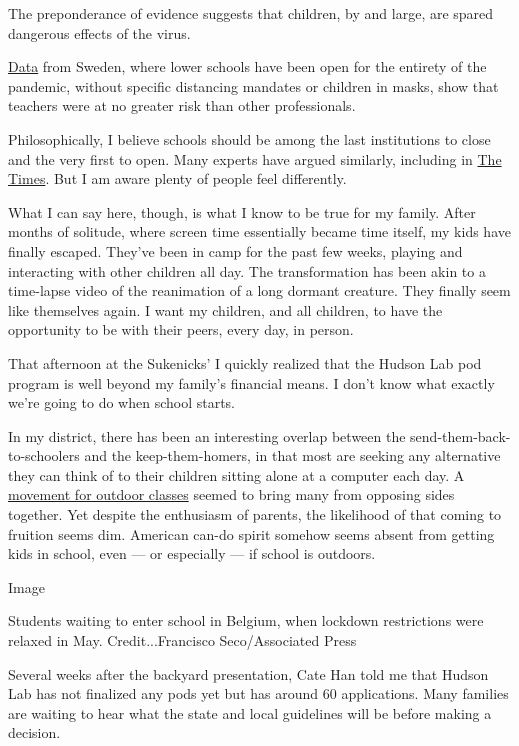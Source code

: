 The preponderance of evidence suggests that children, by and large, are
spared dangerous effects of the virus.

\href{https://www.folkhalsomyndigheten.se/contentassets/5e248b82cc284971a1c5fd922e7770f8/forekomst-covid-19-olika-yrkesgrupper.pdf}{Data}
from Sweden, where lower schools have been open for the entirety of the
pandemic, without specific distancing mandates or children in masks,
show that teachers were at no greater risk than other professionals.

Philosophically, I believe schools should be among the last institutions
to close and the very first to open. Many experts have argued similarly,
including in
\href{https://www.nytimes.com/2020/07/01/opinion/coronavirus-schools.html}{The
Times}. But I am aware plenty of people feel differently.

What I can say here, though, is what I know to be true for my family.
After months of solitude, where screen time essentially became time
itself, my kids have finally escaped. They've been in camp for the past
few weeks, playing and interacting with other children all day. The
transformation has been akin to a time-lapse video of the reanimation of
a long dormant creature. They finally seem like themselves again. I want
my children, and all children, to have the opportunity to be with their
peers, every day, in person.

That afternoon at the Sukenicks' I quickly realized that the Hudson Lab
pod program is well beyond my family's financial means. I don't know
what exactly we're going to do when school starts.

In my district, there has been an interesting overlap between the
send-them-back-to-schoolers and the keep-them-homers, in that most are
seeking any alternative they can think of to their children sitting
alone at a computer each day. A
\href{https://www.nytimes.com/2020/07/17/nyregion/coronavirus-nyc-schools-reopening-outdoors.html}{movement
for outdoor classes} seemed to bring many from opposing sides together.
Yet despite the enthusiasm of parents, the likelihood of that coming to
fruition seems dim. American can-do spirit somehow seems absent from
getting kids in school, even --- or especially --- if school is
outdoors.

Image

Students waiting to enter school in Belgium, when lockdown restrictions
were relaxed in May. Credit...Francisco Seco/Associated Press

Several weeks after the backyard presentation, Cate Han told me that
Hudson Lab has not finalized any pods yet but has around 60
applications. Many families are waiting to hear what the state and local
guidelines will be before making a decision.

